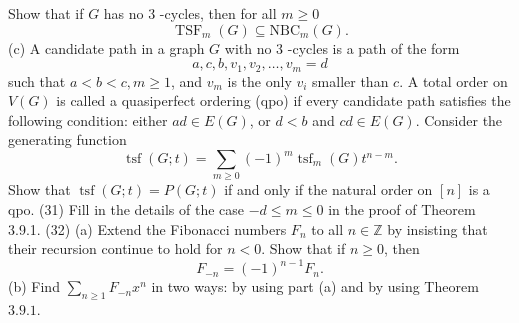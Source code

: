 \documentclass[a4paper,12pt]{ctexbook}
\begin{document}
Show that if $G$ has no 3 -cycles, then for all $m \geq 0$
$$
\operatorname{TSF}_{m}(G) \subseteq \mathrm{NBC}_{m}(G) .
$$
(c) A candidate path in a graph $G$ with no 3 -cycles is a path of the form
$$
a, c, b, v_{1}, v_{2}, \ldots, v_{m}=d
$$
such that $a<b<c, m \geq 1$, and $v_{m}$ is the only $v_{i}$ smaller than $c$. A total order on $V(G)$ is called a quasiperfect ordering (qpo) if every candidate path satisfies the following condition: either $a d \in E(G)$, or $d<b$ and $c d \in E(G)$. Consider the generating function
$$
\operatorname{tsf}(G ; t)=\sum_{m \geq 0}(-1)^{m} \operatorname{tsf}_{m}(G) t^{n-m} .
$$
Show that $\operatorname{tsf}(G ; t)=P(G ; t)$ if and only if the natural order on $[n]$ is a qpo.
(31) Fill in the details of the case $-d \leq m \leq 0$ in the proof of Theorem 3.9.1.
(32) (a) Extend the Fibonacci numbers $F_{n}$ to all $n \in \mathbb{Z}$ by insisting that their recursion continue to hold for $n<0$. Show that if $n \geq 0$, then
$$
F_{-n}=(-1)^{n-1} F_{n} .
$$
(b) Find $\sum_{n \geq 1} F_{-n} x^{n}$ in two ways: by using part (a) and by using Theorem $3.9 .1$.
\end{document}
